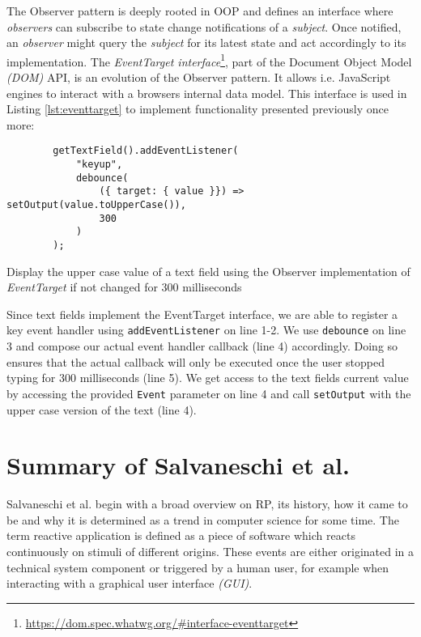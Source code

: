 \documentclass[12pt,a4paper]{article}
\begin{document}
The Observer pattern \cite{gamma1995design} is deeply rooted in OOP and defines an interface where \emph{observers} can subscribe to state change notifications of a \emph{subject}. Once notified, an \emph{observer} might query the \emph{subject} for its latest state and act accordingly to its implementation. The \emph{EventTarget interface}\footnote{\url{https://dom.spec.whatwg.org/\#interface-eventtarget}}, part of the Document Object Model \emph{(DOM)} API, is an evolution of the Observer pattern. It allows i.e. JavaScript engines to interact with a browsers internal data model. This interface is used in Listing \ref{lst:eventtarget} to implement functionality presented previously once more:

\begin{listing}[H]
	\begin{verbatim}
		getTextField().addEventListener(
			"keyup",
			debounce(
				({ target: { value }}) => setOutput(value.toUpperCase()),
				300
			)
		);
	\end{verbatim}
	\caption{Display the upper case value of a text field using the Observer implementation of \emph{EventTarget} if not changed for 300 milliseconds}
	\label{lst:eventtarget}
\end{listing}

Since text fields implement the EventTarget interface, we are able to register a key event handler using \texttt{addEventListener} on line 1-2. We use \texttt{debounce} on line 3 and compose our actual event handler callback (line 4) accordingly. Doing so ensures that the actual callback will only be executed once the user stopped typing for 300 milliseconds (line 5). We get access to the text fields current value by accessing the provided \texttt{Event} parameter on line 4 and call \texttt{setOutput} with the upper case version of the text (line 4).

\section{Summary of Salvaneschi et al.}
\label{sec:summary}

Salvaneschi et al. \cite{7827078} begin with a broad overview on RP, its history, how it came to be and why it is determined as a trend in computer science for some time. The term reactive application is defined as a piece of software which reacts continuously on stimuli of different origins. These events are either originated in a technical system component or triggered by a human user, for example when interacting with a graphical user interface \emph{(GUI)}.
\end{document}
